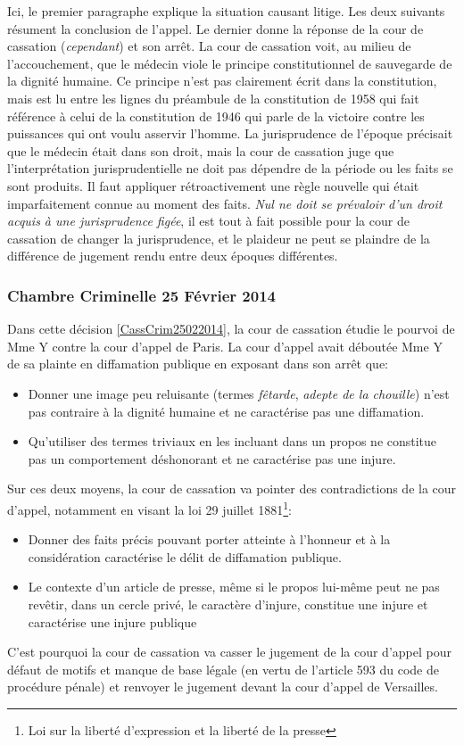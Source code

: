 \documentclass[math]{cours}
\begin{document}
Ici, le premier paragraphe explique la situation causant litige.
Les deux suivants résument la conclusion de l'appel.
Le dernier donne la réponse de la cour de cassation (\textit{cependant}) et son arrêt.
La cour de cassation voit, au milieu de l'accouchement, que le médecin viole le principe constitutionnel de sauvegarde de la dignité humaine.
Ce principe n'est pas clairement écrit dans la constitution, mais est lu entre les lignes du préambule de la constitution de 1958 qui fait référence à celui de la constitution de 1946 qui parle de la victoire contre les puissances qui ont voulu asservir l'homme.
La jurisprudence de l'époque précisait que le médecin était dans son droit, mais la cour de cassation juge que l'interprétation jurisprudentielle ne doit pas dépendre de la période ou les faits se sont produits.
Il faut appliquer rétroactivement une règle nouvelle qui était imparfaitement connue au moment des faits.
\textit{Nul ne doit se prévaloir d'un droit acquis à une jurisprudence figée}, il est tout à fait possible pour la cour de cassation de changer la jurisprudence,
et le plaideur ne peut se plaindre de la différence de jugement rendu entre deux époques différentes.


\subsubsection{Chambre Criminelle 25 Février 2014}
Dans cette décision \ref{CassCrim25022014}, la cour de cassation étudie le pourvoi de Mme Y contre la cour d'appel de Paris.
La cour d'appel avait déboutée Mme Y de sa plainte en diffamation publique en exposant dans son arrêt que:
\begin{itemize}
	\item Donner une image peu reluisante (termes \textit{fêtarde}, \textit{adepte de la chouille}) n'est pas contraire à la dignité humaine et ne caractérise pas une diffamation.
	\item Qu'utiliser des termes triviaux en les incluant dans un propos ne constitue pas un comportement déshonorant et ne caractérise pas une injure.
\end{itemize}
Sur ces deux moyens, la cour de cassation va pointer des contradictions de la cour d'appel, notamment en visant la loi 29 juillet 1881\footnote{Loi sur la liberté d'expression et la liberté de la presse}:
\begin{itemize}
	\item Donner des faits précis pouvant porter atteinte à l'honneur et à la considération caractérise le délit de diffamation publique.
	\item Le contexte d'un article de presse, même si le propos lui-même peut ne pas revêtir, dans un cercle privé, le caractère d'injure, constitue une injure et caractérise une injure publique
\end{itemize}
C'est pourquoi la cour de cassation va casser le jugement de la cour d'appel pour défaut de motifs et manque de base légale (en vertu de l'article 593 du code de procédure pénale) et renvoyer le jugement devant la cour d'appel de Versailles.
\end{document}
